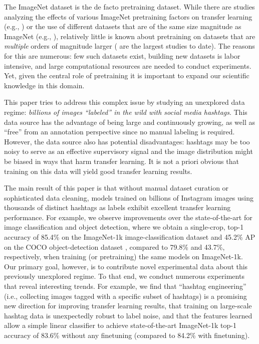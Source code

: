 \documentclass[runningheads]{llncs}
\makeatletter
\newcommand{\eg}{e.g.\@\xspace}
\newcommand{\ie}{i.e.\@\xspace}
\makeatother
\begin{document}
The ImageNet dataset \cite{russakovsky2015} is the de facto pretraining dataset. While there are studies analyzing the effects of various ImageNet pretraining factors on transfer learning (\eg, \cite{Agrawal2014,huh2016}) or the use of different datasets that are of the same size magnitude as ImageNet (\eg, \cite{zhou2017places,xie2017resnext}), relatively little is known about pretraining on datasets that are \emph{multiple} orders of magnitude larger (\cite{joulin2016learning,sun2017unreasonable} are the largest studies to date). The reasons for this are numerous: few such datasets exist, building new datasets is labor intensive, and large computational resources are needed to conduct experiments. Yet, given the central role of pretraining it is important to expand our scientific knowledge in this domain.

This paper tries to address this complex issue by studying an unexplored data regime: \emph{billions of images ``labeled'' in the wild with social media hashtags}. This data source has the advantage of being large and continuously growing, as well as ``free'' from an annotation perspective since no manual labeling is required. However, the data source also has potential disadvantages: hashtags may be too noisy to serve as an effective supervisory signal and the image distribution might be biased in ways that harm transfer learning. It is not a priori obvious that training on this data will yield good transfer learning results.

The main result of this paper is that without manual dataset curation or sophisticated data cleaning, models trained on billions of Instagram images using thousands of distinct hashtags as labels exhibit excellent transfer learning performance. For example, we observe improvements over the state-of-the-art for image classification and object detection, where we obtain a single-crop, top-1 accuracy of 85.4\% on the ImageNet-1k image-classification dataset and 45.2\% AP on the COCO object-detection dataset \cite{mscoco2014}, compared to 79.8\% and 43.7\%, respectively, when training (or pretraining) the same models on ImageNet-1k. Our primary goal, however, is to contribute novel experimental data about this previously unexplored regime. To that end, we conduct numerous experiments that reveal interesting trends. For example, we find that ``hashtag engineering'' (\ie, collecting images tagged with a specific subset of hashtags) is a promising new direction for improving transfer learning results, that training on large-scale hashtag data is unexpectedly robust to label noise, and that the features learned allow a simple linear classifier to achieve state-of-the-art ImageNet-1k top-1 accuracy of 83.6\% without any finetuning (compared to 84.2\% with finetuning).
\end{document}
